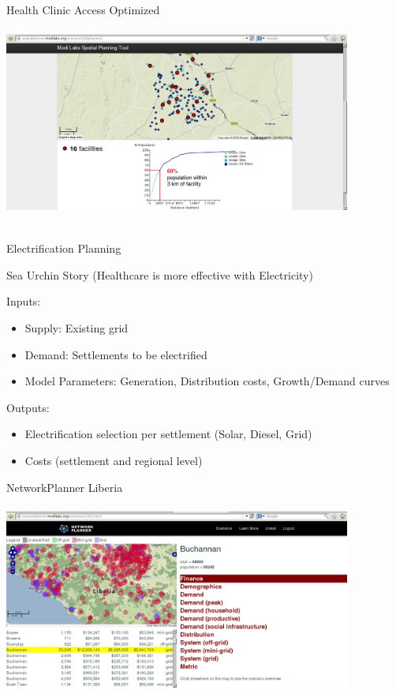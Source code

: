 \documentclass{beamer}
\begin{document}
\begin{frame}{Health Clinic Access Optimized}
  \includegraphics[width=4.5in,height=2.75in]{../diagrams/nigeria-healthcare-optimized_16.png}
\end{frame}

\begin{frame}{Electrification Planning}
  
  Sea Urchin Story (Healthcare is more effective with Electricity)

  \bigskip 
  Inputs: 
  \begin{itemize}
  \item[] Supply:  Existing grid
  \item[] Demand:  Settlements to be electrified
  \item[] Model Parameters:  Generation, Distribution costs, Growth/Demand curves
  \end{itemize}

  \bigskip 

  Outputs: 
  \begin{itemize}
  \item[] Electrification selection per settlement (Solar, Diesel, Grid)
  \item[] Costs (settlement and regional level)
  \end{itemize}

\end{frame}

\begin{frame}{NetworkPlanner Liberia}
  \includegraphics[width=4.5in,height=2.75in]{../diagrams/network-planner-liberia.png}
\end{frame}
\end{document}
